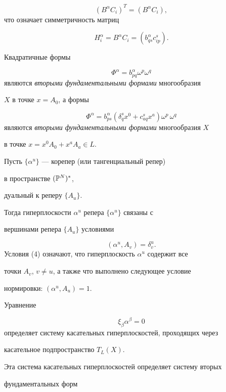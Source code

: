 $$


(B^\alpha C_i)^T = (B^\alpha C_i),


$$
что означает симметричность матриц


$$


H^\alpha_i = B^\alpha C_i = (b^\alpha_{qs} c^s_{ip}).


$$





Квадратичные формы


$$


\Phi^\alpha = b_{pq}^\alpha \omega^p \omega^q


$$
являются {\it вторыми фундаментальными формами} многообразия


$X$ в точке $x = A_0$, а формы


$$
\Phi^\alpha = b^\alpha_{ps} (\delta^s_q x^0 + c^s_{aq} x^a) 
\omega^p \, \omega^q
$$
являются {\it вторыми фундаментальными формами} многообразия $X$


в точке $x = x^0 A_0 + x^a A_a \in L$.



Пусть $\{\alpha^u\}$ --- корепер (или тангенциальный репер)


в пространстве $(\Bbb{P}^{N})^*$,


дуальный к реперу $\{A_u\}$.


Тогда гиперплоскости $\alpha^u$ репера $\{\alpha^u\}$ связаны с


вершинами репера $\{ A_u\}$ условиями


\begin{equation}


\label{eq:9}


(\alpha^u, A_v) = \delta^u_v.
\end{equation}
Условия (4) означают, что гиперплоскость $\alpha^u$ содержит все


точки $A_v$, $v \neq u$, а также что выполнено следующее условие


нормировки: $(\alpha^u, A_u) = 1$.



Уравнение


$$\xi_\beta \alpha^\beta = 0


$$
определяет систему касательных гиперплоскостей, проходящих через


касательное подпространство $T_L (X)$.


Эта система касательных гиперплоскостей определяет систему вторых


фундаментальных форм


